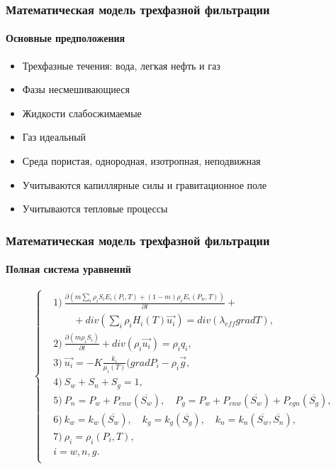 \documentclass[10pt,pdf,hyperref={unicode}]{beamer} %
\begin{document}
\begin{frame}
\begin{center}
\frametitle{Математическая модель трехфазной фильтрации}
\framesubtitle{Основные предположения}
\begin{itemize}
\item Трехфазные течения: вода, легкая нефть и газ
\vspace{0.3cm}
\item Фазы несмешивающиеся
\vspace{0.3cm}
\item Жидкости слабосжимаемые
\vspace{0.3cm}
\item Газ идеальный
\vspace{0.3cm}
\item Среда пористая, однородная, изотропная, неподвижная
\vspace{0.3cm}
\item Учитываются капиллярные силы и гравитационное поле
\vspace{0.3cm}
\item Учитываются тепловые процессы
\end{itemize}
\end{center}
\end{frame}

\begin{frame}
\begin{center}
\frametitle{Математическая модель трехфазной фильтрации}
\framesubtitle{Полная система уравнений}
\begin{equation*}
\left\{
  \begin{aligned}
    & \text{1)}\ \frac{\partial \left(m {\sum\limits_{i}{\rho_i S_i E_i(P_i, T)}} + (1-m){\rho_r E_r(P_w, T)}\right)}{\partial t} + \\
    & \qquad + div(\sum_{i}{\rho_i H_i(T) \overrightarrow{u_i}}) = div(\lambda_{eff} grad T),\\
    & \text{2)}\ \frac{\partial (m \rho_i S_i)}{\partial t}+ div(\rho_i \overrightarrow{u_i}) = \rho_i q_i,\\
    & \text{3)}\ \overrightarrow{u_i}=-K \frac{k_i}{{\mu_i(T)}}(grad P_i - {\rho}_i\overrightarrow{g},\\
    & \text{4)}\ S_w + S_n + S_g=1,\\
    & \text{5)}\ P_n=P_w+P_{cnw}(\overline{S_w}),\quad P_g=P_w+P_{cnw}(\overline{S_w})+P_{cgn}(\overline{S_g}),\\
    & \text{6)}\ k_w=k_w(\overline{S_w}),\quad k_g=k_g(\overline{S_g}),\quad k_n=k_n(\overline{S_w},\overline{S_n}),\\
    & \text{7)}\ \rho_i=\rho_i(P_i,T),\\
    &i=w,n,g. \\
  \end{aligned}
\right.
\end{equation*}
\end{center}
\end{frame}
\end{document}
